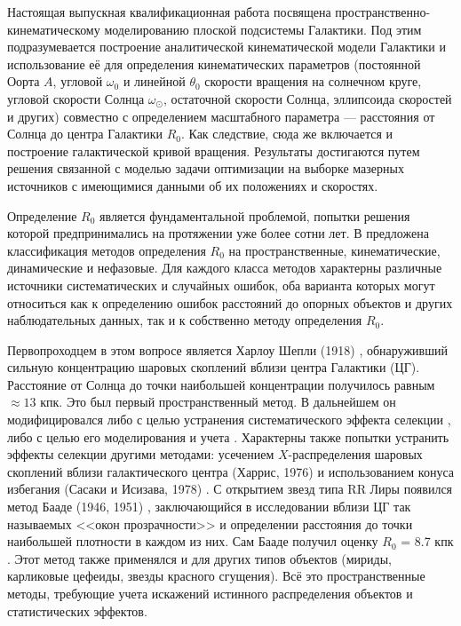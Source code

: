 \documentclass[a4paper, oneside, 14pt]{article}
\begin{document}
Настоящая выпускная квалификационная работа посвящена пространственно-кинематическому моделированию плоской подсистемы Галактики. Под этим подразумевается построение аналитической кинематической модели Галактики и использование её для определения кинематических параметров (постоянной Оорта $ A $, угловой $ \omega_0 $ и линейной $ \theta_0 $ скорости вращения на солнечном круге, угловой скорости Солнца $ \omega_\odot $, остаточной скорости Солнца, эллипсоида скоростей и других) совместно с определением масштабного параметра --- расстояния от Солнца до центра Галактики $ R_0 $. Как следствие, сюда же включается и построение галактической кривой вращения. Результаты достигаются путем решения связанной с моделью задачи оптимизации на выборке мазерных источников с имеющимися данными об их положениях и скоростях.

Определение $ R_0 $ является фундаментальной проблемой, попытки решения которой предпринимались на протяжении уже более сотни лет. В \cite{N.2003, N.2004} предложена классификация методов определения $ R_0 $ на пространственные, кинематические, динамические и нефазовые. Для каждого класса методов характерны различные источники систематических и случайных ошибок, оба варианта которых могут относиться как к определению ошибок расстояний до опорных объектов и других наблюдательных данных, так и к собственно методу определения $ R_0 $.

Первопроходцем в этом вопросе является Харлоу Шепли (1918) \cite{S.1918}, обнаруживший сильную концентрацию шаровых скоплений вблизи центра Галактики (ЦГ). Расстояние от Солнца до точки наибольшей концентрации получилось равным ${}\approx13$ кпк. Это был первый пространственный метод. В дальнейшем он модифицировался либо с целью устранения систематического эффекта селекции \cite{W.1975, F.W.1982, R.H.1989}, либо с целью его моделирования и учета \cite{R.P.D.F.1994}. Характерны также попытки устранить эффекты селекции другими методами: усечением $X$-распределения шаровых скоплений вблизи галактического центра (Харрис, 1976) \cite{H.1976} и использованием конуса избегания (Сасаки и Исизава, 1978) \cite{S.I.1978}. С открытием звезд типа RR Лиры появился метод Бааде (1946, 1951) \cite{B.1946, B.1951}, заключающийся в исследовании вблизи ЦГ так называемых <<окон прозрачности>> и определении расстояния до точки наибольшей плотности в каждом из них. Сам Бааде получил оценку $ R_0 $ = 8.7 кпк \cite{B.1951}. Этот метод также применялся и для других типов объектов (мириды, карликовые цефеиды, звезды красного сгущения). Всё это пространственные методы, требующие учета искажений истинного распределения объектов и статистических эффектов.
\end{document}

